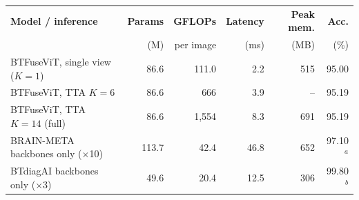 \begin{tabular}{>{\raggedright\arraybackslash}p{3.9cm} r r r r r}
\toprule
\textbf{Model / inference} & \textbf{Params} & \textbf{GFLOPs} & \textbf{Latency} & \textbf{Peak mem.} & \textbf{Acc.} \\
 & (M) & per image & (ms) & (MB) & (\%) \\
\midrule
BTFuseViT, single view ($K{=}1$) & 86.6 & 111.0 & 2.2 & 515 & 95.00 \\
BTFuseViT, TTA $K{=}6$ & 86.6 & 666 & 3.9 & -- & 95.19 \\
BTFuseViT, TTA $K{=}14$ (full) & 86.6 & 1,554 & 8.3 & 691 & 95.19 \\
BRAIN-META backbones only ($\times$10) & 113.7 & 42.4 & 46.8 & 652 & 97.10$^{a}$ \\
BTdiagAI backbones only ($\times$3) & 49.6 & 20.4 & 12.5 & 306 & 99.80$^{b}$ \\
\bottomrule
\end{tabular}
